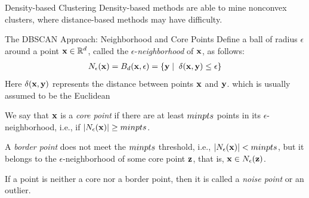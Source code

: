 
\date{Chapter 15: Density-based Clustering}

\begin{frame}
\titlepage
\end{frame}


\begin{frame}{Density-based Clustering}
Density-based methods 
are able to mine nonconvex clusters, where distance-based methods may
have difficulty.
\begin{figure}
\begin{center}
\end{center}
\end{figure}
\end{frame}



\begin{frame}{The DBSCAN Approach: Neighborhood and Core Points}
Def\/{i}ne a ball of radius $\epsilon$ around a point
$\mathbf{x} \in {\mathord{\mathbb R}}^d$, called the $\epsilon$-{\em neighborhood} of $\mathbf{x}$, as
follows:
\begin{align*}
  N_{\epsilon}(\mathbf{x}) = B_d(\mathbf{x},\epsilon) = \{\mathbf{y} \mid
  \;\delta(\mathbf{x},\mathbf{y}) \leq \epsilon\}
\end{align*}
Here $\delta(\mathbf{x}, \mathbf{y})$ represents the distance between points
$\mathbf{x}$ and $\mathbf{y}$.
which is usually assumed to be the Euclidean

\medskip
We say that $\mathbf{x}$ is a {\em core
point} if there are at least $minpts$ points in its
$\epsilon$-neighborhood, i.e., if 
$|N_{\epsilon}(\mathbf{x})| \geq
minpts$.

\medskip
A {\em border point}
does not meet the $minpts$ threshold, i.e.,
$|N_{\epsilon}(\mathbf{x})| < minpts$, but it belongs to the $\epsilon$-neighborhood of some core point $\mathbf{z}$, that is, $\mathbf{x} \in N_\epsilon(\mathbf{z})$.

\medskip
If a point is neither a core nor a border point, then it
is called a {\em noise point} or an outlier.
\end{frame}


